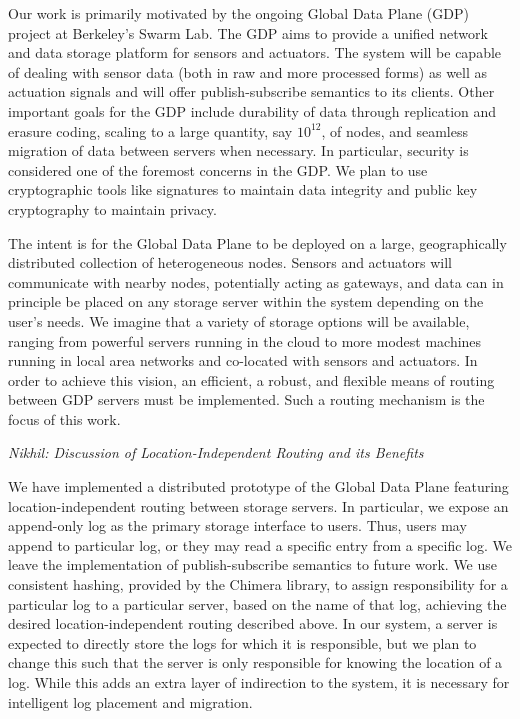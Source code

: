 Our work is primarily motivated by the ongoing Global Data Plane (GDP)\cite{gdp} project at Berkeley's Swarm Lab. The GDP aims to provide a unified network and data storage platform for sensors and actuators. The system will be capable of dealing with sensor data (both in raw and more processed forms) as well as actuation signals and will offer publish-subscribe semantics to its clients. Other important goals for the GDP include durability of data through replication and erasure coding, scaling to a large quantity, say $10^{12}$, of nodes, and seamless migration of data between servers when necessary. In particular, security is considered one of the foremost concerns in the GDP. We plan to use cryptographic tools like signatures to maintain data integrity and public key cryptography to maintain privacy.

The intent is for the Global Data Plane to be deployed on a large, geographically distributed collection of heterogeneous nodes. Sensors and actuators will communicate with nearby nodes, potentially acting as gateways, and data can in principle be placed on any storage server within the system depending on the user's needs. We imagine that a variety of storage options will be available, ranging from powerful servers running in the cloud to more modest machines running in local area networks and co-located with sensors and actuators. In order to achieve this vision, an efficient, a robust, and flexible means of routing between GDP servers must be implemented. Such a routing mechanism is the focus of this work.

\textit{Nikhil: Discussion of Location-Independent Routing and its Benefits}

We have implemented a distributed prototype of the Global Data Plane featuring location-independent routing between storage servers. In particular, we expose an append-only log as the primary storage interface to users. Thus, users may append to particular log, or they may read a specific entry from a specific log. We leave the implementation of publish-subscribe semantics to future work. We use consistent hashing, provided by the Chimera\cite{chimera} library, to assign responsibility for a particular log to a particular server, based on the name of that log, achieving the desired location-independent routing described above. In our system, a server is expected to directly store the logs for which it is responsible, but we plan to change this such that the server is only responsible for knowing the location of a log. While this adds an extra layer of indirection to the system, it is necessary for intelligent log placement and migration.

